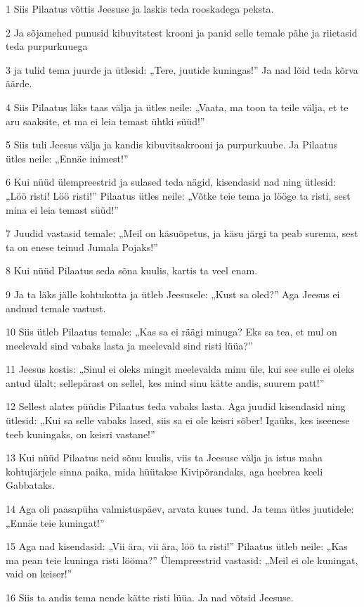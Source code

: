 \par 1 Siis Pilaatus võttis Jeesuse ja laskis teda rooskadega peksta.
\par 2 Ja sõjamehed punusid kibuvitstest krooni ja panid selle temale pähe ja riietasid teda purpurkuuega
\par 3 ja tulid tema juurde ja ütlesid: „Tere, juutide kuningas!” Ja nad lõid teda kõrva äärde.
\par 4 Siis Pilaatus läks taas välja ja ütles neile: „Vaata, ma toon ta teile välja, et te aru saaksite, et ma ei leia temast ühtki süüd!”
\par 5 Siis tuli Jeesus välja ja kandis kibuvitsakrooni ja purpurkuube. Ja Pilaatus ütles neile: „Ennäe inimest!”
\par 6 Kui nüüd ülempreestrid ja sulased teda nägid, kisendasid nad ning ütlesid: „Löö risti! Löö risti!” Pilaatus ütles neile: „Võtke teie tema ja lööge ta risti, sest mina ei leia temast süüd!”
\par 7 Juudid vastasid temale: „Meil on käsuõpetus, ja käsu järgi ta peab surema, sest ta on enese teinud Jumala Pojaks!”
\par 8 Kui nüüd Pilaatus seda sõna kuulis, kartis ta veel enam.
\par 9 Ja ta läks jälle kohtukotta ja ütleb Jeesusele: „Kust sa oled?” Aga Jeesus ei andnud temale vastust.
\par 10 Siis ütleb Pilaatus temale: „Kas sa ei räägi minuga? Eks sa tea, et mul on meelevald sind vabaks lasta ja meelevald sind risti lüüa?”
\par 11 Jeesus kostis: „Sinul ei oleks mingit meelevalda minu üle, kui see sulle ei oleks antud ülalt; sellepärast on sellel, kes mind sinu kätte andis, suurem patt!”
\par 12 Sellest alates püüdis Pilaatus teda vabaks lasta. Aga juudid kisendasid ning ütlesid: „Kui sa selle vabaks lased, siis sa ei ole keisri sõber! Igaüks, kes iseenese teeb kuningaks, on keisri vastane!”
\par 13 Kui nüüd Pilaatus neid sõnu kuulis, viis ta Jeesuse välja ja istus maha kohtujärjele sinna paika, mida hüütakse Kivipõrandaks, aga heebrea keeli Gabbataks.
\par 14 Aga oli paasapüha valmistuspäev, arvata kuues tund. Ja tema ütles juutidele: „Ennäe teie kuningat!”
\par 15 Aga nad kisendasid: „Vii ära, vii ära, löö ta risti!” Pilaatus ütleb neile: „Kas ma pean teie kuninga risti lööma?” Ülempreestrid vastasid: „Meil ei ole kuningat, vaid on keiser!”
\par 16 Siis ta andis tema nende kätte risti lüüa. Ja nad võtsid Jeesuse.

